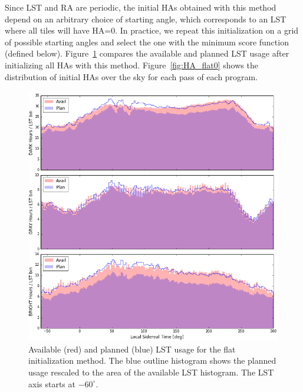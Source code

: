 \documentclass[12pt]{article}
\providecommand{\fig}[1]{Figure~\ref{fig:#1}}
\begin{document}
Since LST and RA are periodic, the initial HAs obtained with this method depend on an arbitrary choice of starting angle, which corresponds to an LST where all tiles will have HA=0. In practice, we repeat this initialization on a grid of possible starting angles and select the one with the minimum score function (defined below). \fig{LST_flat0} compares the available and planned LST usage after initializing all HAs with this method. \fig{HA_flat0} shows the distribution of initial HAs over the sky for each pass of each program.

\begin{figure}[htb]
\begin{center}
\includegraphics[width=6in]{LST_flat0}
\caption{Available (red) and planned (blue) LST usage for the flat initialization method.  The blue outline histogram shows the planned usage rescaled to the area of the available LST histogram.  The LST axis starts at $-60^\circ$.}
\label{fig:LST_flat0}
\end{center}
\end{figure}
\end{document}
